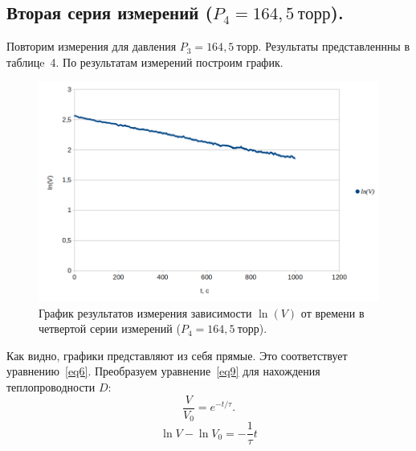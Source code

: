 \documentclass[a4paper,11pt]{article}
\begin{document}
\subsection{Вторая серия измерений ($P_{4} = 164,5\ торр$).}
Повторим измерения для давления $P_{3} = 164,5\ торр$. Результаты представленнны в таблицe~4.
По результатам измерений построим график.
\begin{figure}[h!]\label{fig:img4}
  \centering
  \includegraphics[scale = 0.4125]{graph4.png}
  \caption{График результатов измерения зависимости $\ln(V)$ от времени в четвертой серии измерений ($P_{4} = 164,5\ торр$).}
\end{figure}
Как видно, графики представляют из себя прямые. Это соответствует уравнению~\ref{eq6}. Преобразуем уравнение~\ref{eq9} для нахождения теплопроводности $D$:
\[\frac{V}{V_{0}} = e^{-t/\tau}.\]
\[\ln V - \ln V_{0} = -\frac{1}{\tau} t\]
\end{document}
